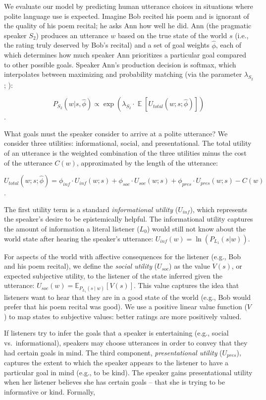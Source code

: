 \documentclass[12pt]{article}
\begin{document}
We evaluate our model by predicting human utterance choices in
situations where polite language use is expected. Imagine Bob recited
his poem and is ignorant of the quality of his poem recital; he asks Ann
how well he did. Ann (the pragmatic speaker \(S_2\)) produces an
utterance \(w\) based on the true state of the world \(s\) (i.e., the
rating truly deserved by Bob's recital) and a set of goal weights
\(\hat{\phi}\), each of which determines how much speaker Ann
prioritizes a particular goal compared to other possible goals. Speaker
Ann's production decision is softmax, which interpolates between maximizing
and probability matching (via the parameter \(\lambda_{S_2}\); \cite{goodman2013}):

\[P_{S_2}(w | s, \hat{\phi}) \propto \exp(\lambda_{S_2} \cdot \mathop{\mathbb{E}}[U_{total}(w; s; \hat{\phi})])\].

What goals must the speaker consider to arrive at a polite utterance? We
consider three utilities: informational, social, and presentational. The
total utility of an utterance is the weighted combination of the three
utilities minus the cost of the utterance \(C(w)\), approximated by the
length of the utterance:

\[U_{total}(w; s; \hat{\phi}) = \phi_{inf} \cdot U_{inf}(w; s) + \phi_{soc} \cdot U_{soc}(w; s) + \phi_{pres} \cdot U_{pres}(w; s) - C(w)\].

The first utility term is a standard \emph{informational utility}
(\(U_{inf}\)), which represents the speaker's desire to be epistemically
helpful. The informational utility captures the amount of information a
literal listener (\(L_0\)) would still not know about the world state
after hearing the speaker's utterance:
\(U_{inf}(w) = \ln(P_{L_1}(s | w))\).

For aspects of the world with affective consequences for the listener
(e.g., Bob and his poem recital), we define the \emph{social utility}
(\(U_{soc}\)) as the value \(V(s)\), or expected subjective utility, to
the listener of the state inferred given the utterance:
\(U_{soc}(w) = \mathbb{E}_{P_{L_1}(s \mid w)}[V(s)]\). This value
captures the idea that listeners want to hear that they are in a good
state of the world (e.g., Bob would prefer that his poem recital was
good). We use a positive linear value function (\(V\)) to map states to
subjective values: better ratings are more positively valued.

If listeners try to infer the goals that a speaker is entertaining
(e.g., social vs.~informational), speakers may choose utterances in
order to convey that they had certain goals in mind. The third
component, \emph{presentational utility} (\(U_{pres}\)), captures the
extent to which the speaker appears to the listener to have a particular
goal in mind (e.g., to be kind). The speaker gains presentational
utility when her listener believes she has certain goals -- that she is
trying to be informative or kind. Formally,
\end{document}
